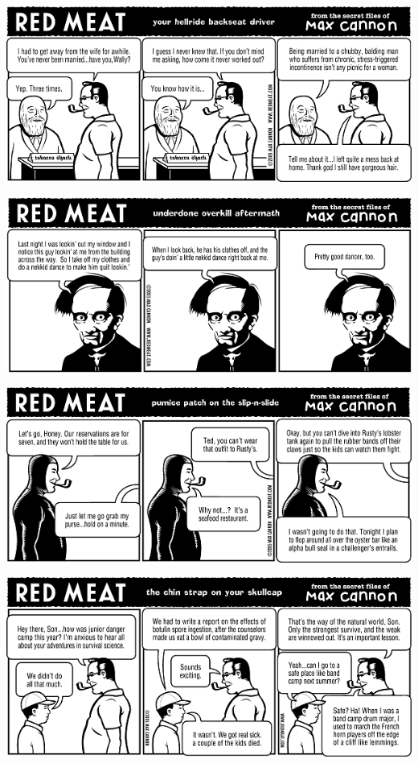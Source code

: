 \documentclass[a4paper,twoside,11pt]{article}
\begin{document}
\includegraphics[width=\textwidth]{redmeat_2005-08-02.png}



\includegraphics[width=\textwidth]{redmeat_2005-08-09.png}



\includegraphics[width=\textwidth]{redmeat_2005-08-16.png}



\includegraphics[width=\textwidth]{redmeat_2005-08-23.png}
\end{document}
